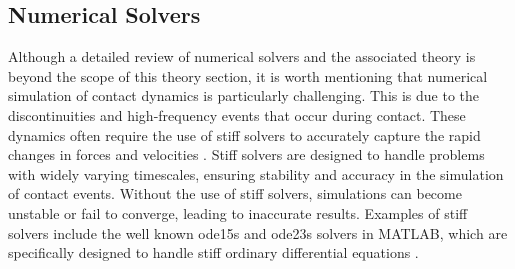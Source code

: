 \subsection{Numerical Solvers}
\label{sec:numerical_solvers}

Although a detailed review of numerical solvers and the associated theory is beyond the scope of this theory section, it is worth mentioning that numerical simulation of contact dynamics is particularly challenging. This is due to the discontinuities and high-frequency events that occur during contact. These dynamics often require the use of stiff solvers to accurately capture the rapid changes in forces and velocities \cite{stiff_contact_ODE_1}\cite{stiff_contact_ODE_2}. Stiff solvers are designed to handle problems with widely varying timescales, ensuring stability and accuracy in the simulation of contact events. Without the use of stiff solvers, simulations can become unstable or fail to converge, leading to inaccurate results. Examples of stiff solvers include the well known ode15s and ode23s solvers in MATLAB, which are specifically designed to handle stiff ordinary differential equations \cite{MATLAB_ODE}. 



